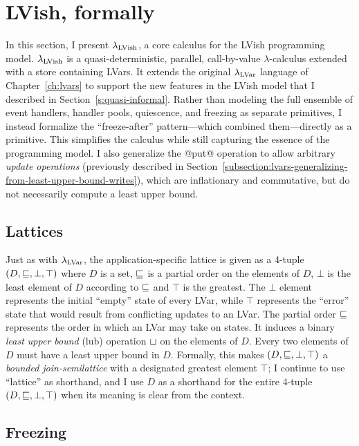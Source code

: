 \section{LVish, formally}\label{s:quasi-formal}

In this section, I present $\lambda_{\textrm{LVish}}$, a core calculus for the
LVish programming model. $\lambda_{\textrm{LVish}}$ is a quasi-deterministic,
parallel, call-by-value $\lambda$-calculus extended with a store
containing LVars.  It extends the original $\lambda_{\textrm{LVar}}$ language of
Chapter~\ref{ch:lvars} to support the new features in the LVish model
that I described in Section~\ref{s:quasi-informal}. Rather than
modeling the full ensemble of event handlers, handler pools,
quiescence, and freezing as separate primitives, I instead formalize
the ``freeze-after'' pattern---which combined them---directly as a
primitive.  This simplifies the calculus while still capturing the
essence of the programming model.  I also generalize the @put@
operation to allow arbitrary \emph{update operations} (previously
described in
Section~\ref{subsection:lvars-generalizing-from-least-upper-bound-writes}),
which are inflationary and commutative, but do not necessarily compute
a least upper bound.

\subsection{Lattices}

Just as with $\lambda_{\textrm{LVar}}$, the application-specific lattice is given
as a 4-tuple $(D, \sqsubseteq, \bot, \top)$ where $D$ is a set,
$\sqsubseteq$ is a partial order on the elements of $D$, $\bot$ is the
least element of $D$ according to $\sqsubseteq$ and $\top$ is the
greatest.  The $\bot$ element represents the initial ``empty'' state
of every LVar, while $\top$ represents the ``error'' state that would
result from conflicting updates to an LVar.  The partial order
$\sqsubseteq$ represents the order in which an LVar may take on states.
It induces a binary \emph{least upper bound} (lub) operation
$ \sqcup $ on the elements of $D$.  Every two elements of $D$ must
have a least upper bound in $D$.  Formally, this makes $(D, \sqsubseteq,
\bot, \top)$ a \emph{bounded join-semilattice} with a designated
greatest element $\top$; I continue to use ``lattice'' as shorthand,
and I use $D$ as a shorthand for the entire 4-tuple $(D, \sqsubseteq,
\bot, \top)$ when its meaning is clear from the context.

\subsection{Freezing}

